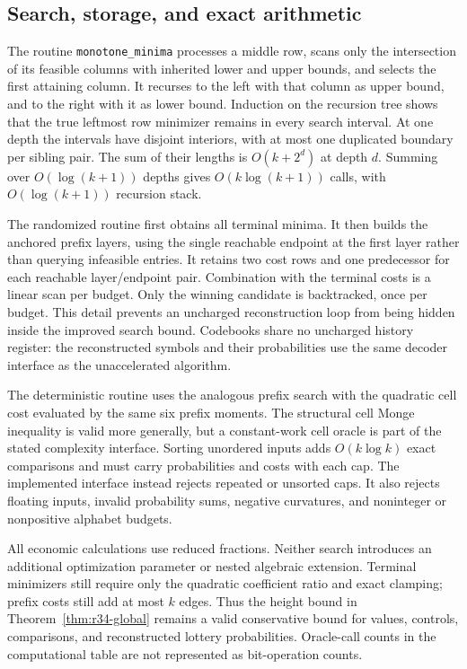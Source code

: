 \subsection{Search, storage, and exact arithmetic}
The routine \texttt{monotone\_minima} processes a middle row, scans only the intersection of its feasible columns with inherited lower and upper bounds, and selects the first attaining column. It recurses to the left with that column as upper bound, and to the right with it as lower bound. Induction on the recursion tree shows that the true leftmost row minimizer remains in every search interval. At one depth the intervals have disjoint interiors, with at most one duplicated boundary per sibling pair. The sum of their lengths is $O(k+2^d)$ at depth $d$. Summing over $O(\log(k+1))$ depths gives $O(k\log(k+1))$ calls, with $O(\log(k+1))$ recursion stack.

The randomized routine first obtains all terminal minima. It then builds the anchored prefix layers, using the single reachable endpoint at the first layer rather than querying infeasible entries. It retains two cost rows and one predecessor for each reachable layer/endpoint pair. Combination with the terminal costs is a linear scan per budget. Only the winning candidate is backtracked, once per budget. This detail prevents an uncharged reconstruction loop from being hidden inside the improved search bound. Codebooks share no uncharged history register: the reconstructed symbols and their probabilities use the same decoder interface as the unaccelerated algorithm.

The deterministic routine uses the analogous prefix search with the quadratic cell cost evaluated by the same six prefix moments. The structural cell Monge inequality is valid more generally, but a constant-work cell oracle is part of the stated complexity interface. Sorting unordered inputs adds $O(k\log k)$ exact comparisons and must carry probabilities and costs with each cap. The implemented interface instead rejects repeated or unsorted caps. It also rejects floating inputs, invalid probability sums, negative curvatures, and noninteger or nonpositive alphabet budgets.

All economic calculations use reduced fractions. Neither search introduces an additional optimization parameter or nested algebraic extension. Terminal minimizers still require only the quadratic coefficient ratio and exact clamping; prefix costs still add at most $k$ edges. Thus the height bound in Theorem~\ref{thm:r34-global} remains a valid conservative bound for values, controls, comparisons, and reconstructed lottery probabilities. Oracle-call counts in the computational table are not represented as bit-operation counts.

